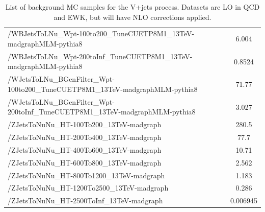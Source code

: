 \begin{table}[htbp]
{\begin{tabular}{l|c}
  /WBJetsToLNu\_Wpt-100to200\_TuneCUETP8M1\_13TeV-madgraphMLM-pythia8            & 6.004    \\ 
  /WBJetsToLNu\_Wpt-200toInf\_TuneCUETP8M1\_13TeV-madgraphMLM-pythia8            & 0.8524   \\ 
  /WJetsToLNu\_BGenFilter\_Wpt-100to200\_TuneCUETP8M1\_13TeV-madgraphMLM-pythia8 & 71.77    \\ 
  /WJetsToLNu\_BGenFilter\_Wpt-200toInf\_TuneCUETP8M1\_13TeV-madgraphMLM-pythia8 & 3.027    \\ 
  \hline
  /ZJetsToNuNu\_HT-100To200\_13TeV-madgraph                                      & 280.5    \\ 
  /ZJetsToNuNu\_HT-200To400\_13TeV-madgraph                                      & 77.7     \\ 
  /ZJetsToNuNu\_HT-400To600\_13TeV-madgraph                                      & 10.71    \\ 
  /ZJetsToNuNu\_HT-600To800\_13TeV-madgraph                                      & 2.562    \\ 
  /ZJetsToNuNu\_HT-800To1200\_13TeV-madgraph                                     & 1.183    \\ 
  /ZJetsToNuNu\_HT-1200To2500\_13TeV-madgraph                                    & 0.286    \\ 
  /ZJetsToNuNu\_HT-2500ToInf\_13TeV-madgraph                                     & 0.006945 \\ 
  \hline
  \end{tabular}}
  \caption{List of background MC samples for the V+jets process. Datasets are LO in QCD and EWK, but will have NLO corrections applied.}
  \label{tab:vjets_mc}
\end{table}

